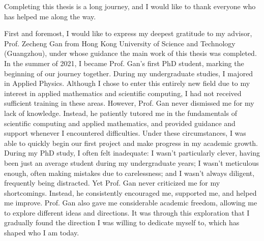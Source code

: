 
Completing this thesis is a long journey, and I would like to thank everyone who has helped me along the way.

First and foremost, I would like to express my deepest gratitude to my advisor, Prof. Zecheng Gan from Hong Kong University of Science and Technology (Guangzhou), under whose guidance the main work of this thesis was completed.
In the summer of 2021, I became Prof. Gan's first PhD student, marking the beginning of our journey together.
During my undergraduate studies, I majored in Applied Physics. 
Although I chose to enter this entirely new field due to my interest in applied mathematics and scientific computing, I had not received sufficient training in these areas.
However, Prof. Gan never dismissed me for my lack of knowledge. Instead, he patiently tutored me in the fundamentals of scientific computing and applied mathematics, and provided guidance and support whenever I encountered difficulties.
Under these circumstances, I was able to quickly begin our first project and make progress in my academic growth.
During my PhD study, I often felt inadequate: I wasn't particularly clever, having been just an average student during my undergraduate years; I wasn't meticulous enough, often making mistakes due to carelessness; and I wasn't always diligent, frequently being distracted.
Yet Prof. Gan never criticized me for my shortcomings. 
Instead, he consistently encouraged me, supported me, and helped me improve.
Prof. Gan also gave me considerable academic freedom, allowing me to explore different ideas and directions. 
It was through this exploration that I gradually found the direction I was willing to dedicate myself to, which has shaped who I am today.

